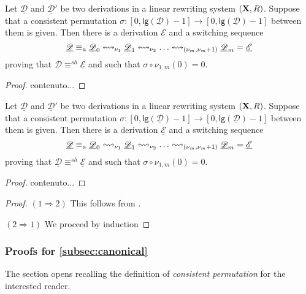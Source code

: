 \documentclass[a4paper,UKenglish,cleveref,pdftex,thm-restate,numberwithinsect]{lipics-v2021}
\def\R{\mathsf{R}}
\def\X{\textbf {\textup{X}}}
\newcommand{\dder}[1]{\mathscr{#1}}
\newcommand{\der}[1]{\underline{\dder{#1}}}
\newcommand{\lgh}[0]{\mathsf{lg}}
\newcommand{\shift}[1]{\ensuremath{\mathrel{{\leftrightsquigarrow}_{#1}}}}
\begin{document}
\begin{lemma}\label{lem:fix1}
	Let $\der{D}$ and $\der{D}'$ be two derivations in a linear rewriting system $(\X, \R)$. Suppose that a consistent permutation $\sigma:[0, \lgh(\der{D})-1]\to [0, \lgh(\der{D})-1]$ between them is given. Then there is a derivation $\der{E}$ and a switching sequence 
	  \[\der{D}\equiv_a \der{D}_0 \shift{\nu_1} \der{D}_1 \shift{\nu_2} \ldots \shift{\transp{\nu_m}}
	\der{D}_m = \der{E}\]
proving that  $\der{D}\equiv^{sh} \der{E}$ and such that $\sigma\circ \nu_{1,m}(0)=0$.
\end{lemma}
\begin{proof}
	contenuto...
\end{proof}



\begin{lemma}\label{lem:fix2}
	Let $\der{D}$ and $\der{D}'$ be two derivations in a linear rewriting system $(\X, \R)$. Suppose that a consistent permutation $\sigma:[0, \lgh(\der{D})-1]\to [0, \lgh(\der{D})-1]$ between them is given. Then there is a derivation $\der{E}$ and a switching sequence 
	\[\der{D}\equiv_a \der{D}_0 \shift{\nu_1} \der{D}_1 \shift{\nu_2} \ldots \shift{\transp{\nu_m}}
	\der{D}_m = \der{E}\]
	proving that  $\der{D}\equiv^{sh} \der{E}$ and such that $\sigma\circ \nu_{1,m}(0)=0$.
\end{lemma}
\begin{proof}
	contenuto...
\end{proof}


\thmcoswitch*
\label{thmswitch-proof}
\begin{proof}$(1\Rightarrow 2)$ This follows from .

\smallskip \noindent $(2\Rightarrow 1)$ We proceed by induction
\end{proof}
\fi 


\subsubsection{Proofs for \cref{subsec:canonical}}


The section opens recalling the definition of \emph{consistent permutation} 
for the interested reader.
\end{document}
